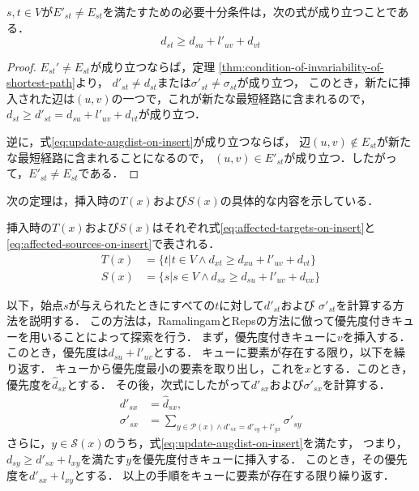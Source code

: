 \begin{lemma}
  \label{lmm:update-augdist-on-insert}
  $s,t\in V$が$E'_{st}\neq E_{st}$を満たすための必要十分条件は，次の式が成り立つことである．
  \begin{equation}
    d_{st}\geq d_{su}+l'_{uv}+d_{vt}
    \label{eq:update-augdist-on-insert}
  \end{equation}
\end{lemma}
\begin{proof}
  $E_{st}'\neq E_{st}$が成り立つならば，定理
  \ref{thm:condition-of-invariability-of-shortest-path}より，
  $d'_{st}\neq d_{st}$または$\sigma'_{st}\neq\sigma_{st}$が成り立つ，
  このとき，新たに挿入された辺は$(u,v)$の一つで，これが新たな最短経路に含まれるので，
  $d_{st}\geq d'_{st}=d_{su}+l'_{uv}+d_{vt}$が成り立つ．

  逆に，式\eqref{eq:update-augdist-on-insert}が成り立つならば，
  辺$(u,v)\notin E_{st}$が新たな最短経路に含まれることになるので，
  $(u,v)\in E'_{st}$が成り立つ．したがって，$E'_{st}\neq E_{st}$である．
\end{proof}

次の定理は，挿入時の$T(x)$および$S(x)$の具体的な内容を示している．
\begin{theorem}
  \label{thm:affected-vertices-on-insert}
  挿入時の$T(x)$および$S(x)$はそれぞれ式\eqref{eq:affected-targets-on-insert}と
  \eqref{eq:affected-sources-on-insert}で表される．
  \begin{align}
    T(x)&=\{t|t\in V\land d_{xt}\geq d_{xu}+l'_{uv}+d_{vt}\}
    \label{eq:affected-targets-on-insert} \\
    S(x)&=\{s|s\in V\land d_{sx}\geq d_{su}+l'_{uv}+d_{vx}\}
    \label{eq:affected-sources-on-insert}
  \end{align}
\end{theorem}

以下，始点$s$が与えられたときにすべての$t$に対して$d'_{st}$および
$\sigma'_{st}$を計算する方法を説明する．
この方法は，RamalingamとRepsの方法に倣って優先度付きキューを用いることによって探索を行う．
まず，優先度付きキューに$v$を挿入する．このとき，優先度は$d_{su}+l'_{uv}$とする．
キューに要素が存在する限り，以下を繰り返す．
キューから優先度最小の要素を取り出し，これを$x$とする．このとき，
優先度を$\hat{d}_{sx}$とする．
その後，次式にしたがって$d'_{sx}$および$\sigma'_{sx}$を計算する．
\begin{equation*}
  \begin{aligned}
    d'_{sx}&=\hat{d}_{sx},\\
    \sigma'_{sx}&=\sum_{y\in\mathcal{P}(x)\land d'_{sx}=d'_{sy}+l'_{yx}}\sigma'_{sy}
  \end{aligned}
\end{equation*}
さらに，$y\in\mathcal{S}(x)$のうち，式\eqref{eq:update-augdist-on-insert}を満たす，
つまり，$d_{sy}\geq d'_{sx}+l_{xy}$を満たす$y$を優先度付きキューに挿入する．
このとき，その優先度を$d'_{sx}+l_{xy}$とする．
以上の手順をキューに要素が存在する限り繰り返す．

